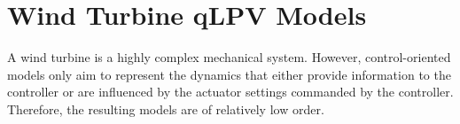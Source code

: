
\chapter{Wind Turbine qLPV Models} \label{sec:WindTurbineqLPVModels}
A wind turbine is a highly complex mechanical system. However, control-oriented models only
aim to represent the dynamics that either provide information to the controller or are influenced
by the actuator settings commanded by the controller. Therefore, the resulting models are of
relatively low order.

